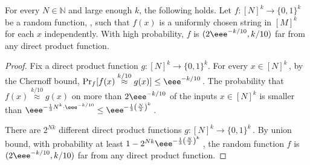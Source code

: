 \documentclass{toc}
\newcommand{\Paren}[1]{\left(#1\right)} %
\newcommand{\set}[1]{\{#1\}} %
\newcommand\f{f} %
\newcommand{\g}{g} %
\newcommand\neql[1]{\stackrel{{#1}}{ \approx}} %
\begin{document}
\begin{claim}
	For every $N\in\mathbb{N}$ and large enough $k$, the following holds. Let $\f:[N]^k\rightarrow\{0,1\}^k$ be a random function, \ie, such that $f(x)$ is a uniformly chosen string in $[M]^k$ for each $x$ independently. With high probability, $f$ is $(2\eee^{-k/10},k/10)$ far from any direct product function.
\end{claim}
\begin{proof}
  Fix a direct product function $\g:[N]^k\rightarrow\set{0,1}^k.$ For every $x\in[N]^k$\,, by
the  %
Chernoff bound, %
 $\Pr_f[\f(x)\neql{k/10}\g(x)]\leq \eee^{-k/10}$\,.
    The probability that $\f(x)\neql{k/10}\g(x)$ on more than $2\eee^{-k/10} $ of the inputs $x\in[N]^k$ is smaller than $\eee^{-\frac{1}{3}N^k\cdot \eee^{-k/10}}\leq \eee^{-\frac{1}{3}\Paren{\frac{N}{2}}^k}$\,. 
    
    There are $2^{Nk}$ different direct product functions $\g:[N]^k\rightarrow\{0,1\}^k$\,. By union bound, with probability at least $1-2^{Nk}\eee^{-\frac{1}{3}\Paren{\frac{N}{2}}^k}$\,, the random function $\f$ is $(2\eee^{-k/10},k/10)$ far from any direct product function.
\end{proof}
\end{document}
